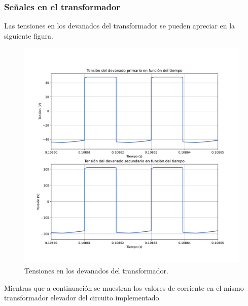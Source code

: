 \subsubsection{Señales en el transformador}

Las tensiones en los devanados del transformador se pueden apreciar en la siguiente figura.

\begin{figure}
	\centering
	\includegraphics[width=1\linewidth]{../../tensiones_transformador}
	\caption{Tensiones en los devanados del transformador.}
	\label{fig:tensionestransformador}
\end{figure}

Mientras que a continuación se muestran los valores de corriente en el mismo transformador elevador del circuito implementado.

